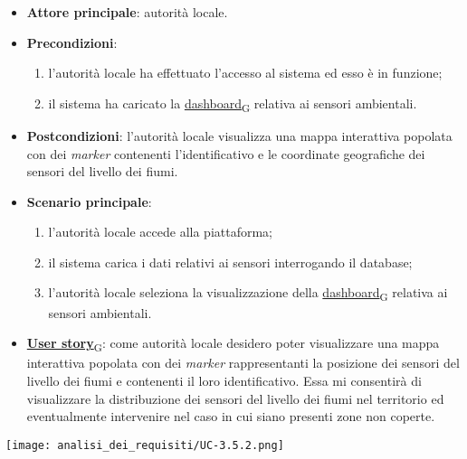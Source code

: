 \begin{itemize}
	\item \textbf{Attore principale}: autorità locale.
	\item \textbf{Precondizioni}:
	      \begin{enumerate}
		      \item l'autorità locale ha effettuato l'accesso al sistema ed esso è in funzione;
		      \item il sistema ha caricato la \href{https://7last.github.io/docs/pb/documentazione-interna/glossario\#dashboard}{dashboard\textsubscript{G}} relativa ai sensori ambientali.
	      \end{enumerate}
	\item \textbf{Postcondizioni}: l'autorità locale visualizza una mappa interattiva popolata con dei \textit{marker} contenenti l'identificativo e le coordinate geografiche dei sensori del livello dei fiumi.
	\item \textbf{Scenario principale}:
	      \begin{enumerate}
		      \item l'autorità locale accede alla piattaforma;
		      \item il sistema carica i dati relativi ai sensori interrogando il database;
		      \item l'autorità locale seleziona la visualizzazione della \href{https://7last.github.io/docs/pb/documentazione-interna/glossario\#dashboard}{dashboard\textsubscript{G}} relativa ai sensori ambientali.
	      \end{enumerate}
	\item \href{https://7last.github.io/docs/pb/documentazione-interna/glossario\#user-story}{\textbf{User story}\textsubscript{G}}:
	      come autorità locale desidero poter visualizzare una mappa interattiva popolata con dei \textit{marker} rappresentanti la posizione dei sensori del livello dei fiumi
	      e contenenti il loro identificativo. Essa mi consentirà di visualizzare la distribuzione dei sensori del livello dei fiumi nel territorio ed eventualmente intervenire nel caso in cui siano presenti zone non coperte.
\end{itemize}
\begin{center}
	\texttt{[image: analisi\_dei\_requisiti/UC-3.5.2.png]}
\end{center}

